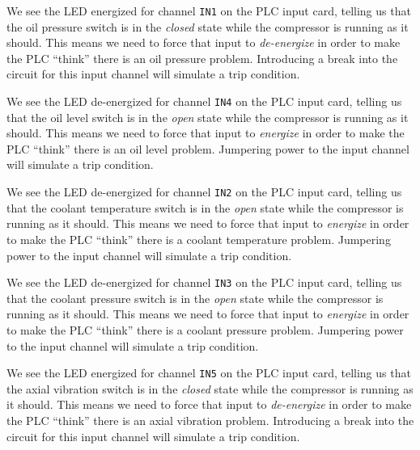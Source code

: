 





We see the LED energized for channel {\tt IN1} on the PLC input card, telling us that the oil pressure switch is in the {\it closed} state while the compressor is running as it should.  This means we need to force that input to {\it de-energize} in order to make the PLC ``think'' there is an oil pressure problem.  Introducing a break into the circuit for this input channel will simulate a trip condition.

\vskip 10pt

We see the LED de-energized for channel {\tt IN4} on the PLC input card, telling us that the oil level switch is in the {\it open} state while the compressor is running as it should.  This means we need to force that input to {\it energize} in order to make the PLC ``think'' there is an oil level problem.  Jumpering power to the input channel will simulate a trip condition.

\vskip 10pt

We see the LED de-energized for channel {\tt IN2} on the PLC input card, telling us that the coolant temperature switch is in the {\it open} state while the compressor is running as it should.  This means we need to force that input to {\it energize} in order to make the PLC ``think'' there is a coolant temperature problem.  Jumpering power to the input channel will simulate a trip condition.

\vskip 10pt

We see the LED de-energized for channel {\tt IN3} on the PLC input card, telling us that the coolant pressure switch is in the {\it open} state while the compressor is running as it should.  This means we need to force that input to {\it energize} in order to make the PLC ``think'' there is a coolant pressure problem.  Jumpering power to the input channel will simulate a trip condition.

\vskip 10pt

We see the LED energized for channel {\tt IN5} on the PLC input card, telling us that the axial vibration switch is in the {\it closed} state while the compressor is running as it should.  This means we need to force that input to {\it de-energize} in order to make the PLC ``think'' there is an axial vibration problem.  Introducing a break into the circuit for this input channel will simulate a trip condition.


